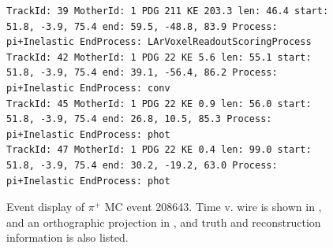 \documentclass[letterpaper,12pt]{article}
\newcommand{\pip}{\ensuremath{\pi^{+}}}
\begin{document}
\begin{figure}[!hbtp]
\begin{center}
\begin{lstlisting}
TrackId: 39 MotherId: 1 PDG 211 KE 203.3 len: 46.4 start: 51.8, -3.9, 75.4 end: 59.5, -48.8, 83.9 Process: pi+Inelastic EndProcess: LArVoxelReadoutScoringProcess
TrackId: 42 MotherId: 1 PDG 22 KE 5.6 len: 55.1 start: 51.8, -3.9, 75.4 end: 39.1, -56.4, 86.2 Process: pi+Inelastic EndProcess: conv
TrackId: 45 MotherId: 1 PDG 22 KE 0.9 len: 56.0 start: 51.8, -3.9, 75.4 end: 26.8, 10.5, 85.3 Process: pi+Inelastic EndProcess: phot
TrackId: 47 MotherId: 1 PDG 22 KE 0.4 len: 99.0 start: 51.8, -3.9, 75.4 end: 30.2, -19.2, 63.0 Process: pi+Inelastic EndProcess: phot
\end{lstlisting}
    \caption{%
                Event display of \pip{} MC event 208643. 
                Time v. wire is shown in , 
                and an orthographic projection in ,
                and truth and reconstruction information is also listed.
            }
    \label{fig:evd_pipMC_208643}
  \end{center}
\end{figure}
\end{document}
